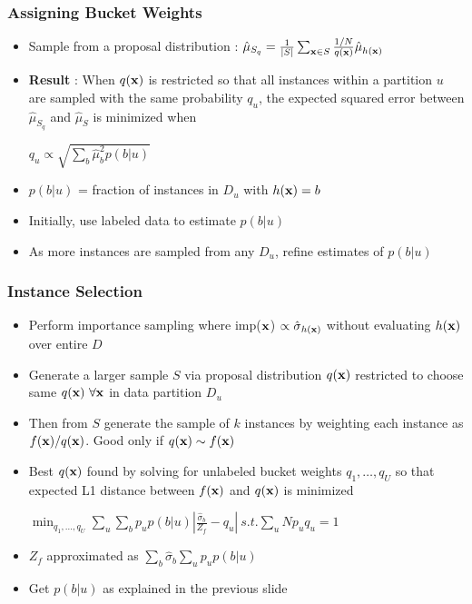 \documentclass[usenames,dvipsnames, 11pt]{beamer}
\newcommand{\vek}[1]{{\bf {#1}}}
\newcommand{\vx}{{\vek{x}}}
\newcommand{\wt}{{p}}
\newcommand{\estSS}{{\mbox{$\hat{\mu}_S$}}}
\newcommand{\estSb}{{\mbox{$\hat{\mu}$}}}
\newcommand{\estVar}{{\mbox{$\hat{\sigma}$}}}
\newlength{\wideitemsep}
\let\olditem\item
\renewcommand{\item}{\setlength{\itemsep}{\wideitemsep}\olditem}
\begin{document}
\begin{frame}
\frametitle{Assigning Bucket Weights}
\begin{itemize}
\item Sample from a proposal distribution : $\hat{\mu}_{S_q} = \frac{1}{|S|}\sum\nolimits_{\vx\in S} \frac{1/N}{q(\vx)}\estSb_{h(\vx)}$
\item \textbf{Result} : When $q(\vx)$ is restricted so that all instances within a partition $u$ are sampled with the same probability $q_u$,
the expected squared error between $\hat{\mu}_{S_q}$ and $\estSS$ is minimized when 
\begin{center} $q_u \propto \sqrt{\sum_{b}\estSb^2_b\wt(b|u)}$ \end{center}
\item $\wt(b|u)$ = fraction of instances in $D_u$ with $h(\vx)=b$
\item Initially, use labeled data to estimate $\wt(b|u)$
\item As more instances are sampled from any $D_u$, refine estimates of $\wt(b|u)$
\end{itemize}
\end{frame}

\begin{frame}
\frametitle{Instance Selection}
\begin{itemize}
\item Perform importance sampling where imp($\vx$) $\propto \estVar_{h(\vx)}$ without evaluating $h(\vx)$ over entire $D$
\item Generate a larger sample $S$ via proposal distribution $q(\vx)$ restricted to choose same $q(\vx) ~\forall \vx$ in data
partition $D_u$ 
\item Then from $S$ generate the sample of $k$ instances by weighting each instance as $f(\vx)/q(\vx)$. Good only if $q(\vx) \sim f(\vx)$
\item Best $q(\vx)$ found by solving for unlabeled bucket weights $q_1,\ldots,q_U$
so that expected L1 distance between $f(\vx)$ and $q(\vx)$ is minimized
\begin{center}
$\min_{q_1,\ldots,q_U} \sum_u\sum_b \wt_u\wt(b|u) \left|\frac{\estVar_b}{Z_f} - q_u\right| ~s.t. \sum_u N\wt_uq_u=1$
\end{center}
\item $Z_f$ approximated as $\sum\nolimits_b\estVar_b\sum\nolimits_u\wt_u\wt(b|u)$
\item Get $\wt(b|u)$ as explained in the previous slide
\end{itemize}
\end{frame}
\end{document}
